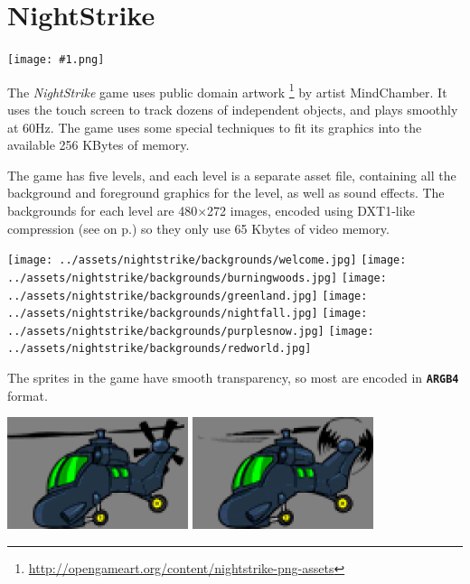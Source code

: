 \documentclass[10pt]{book}
\newcommand{\png}[1]{
\begin{center}
\texttt{[image: \#1.png]}
\end{center}
}
\newcommand{\mach}[1]{\texttt{\textbf{#1}}}
\newcommand{\xref}[1]{\textit{\nameref{#1}} on  p.\pageref{#1}}
\begin{document}
\newpage
\section{NightStrike}
\label{nightstrike}

\png{nightstrike}

The \textit{NightStrike} game uses public domain artwork
\footnote{\url{http://opengameart.org/content/nightstrike-png-assets}}
by artist MindChamber.
It uses the touch screen to track dozens of independent objects,
and plays smoothly at 60Hz.
The game uses some special techniques to fit its graphics into the available 256 KBytes of memory.

The game has five levels, and each level is a separate asset file, containing all the background and foreground graphics
for the level, as well as sound effects.
The backgrounds for each level are 480$\times$272 images, encoded using DXT1-like compression
(see \xref{dxt1})
so they only use 65 Kbytes of video memory.

\begin{center}
\texttt{[image: ../assets/nightstrike/backgrounds/welcome.jpg]}
\texttt{[image: ../assets/nightstrike/backgrounds/burningwoods.jpg]}
\texttt{[image: ../assets/nightstrike/backgrounds/greenland.jpg]}
\texttt{[image: ../assets/nightstrike/backgrounds/nightfall.jpg]}
\texttt{[image: ../assets/nightstrike/backgrounds/purplesnow.jpg]}
\texttt{[image: ../assets/nightstrike/backgrounds/redworld.jpg]}
\end{center}

\newpage

The sprites in the game have smooth transparency, so most are encoded in \mach{ARGB4} format.

\begin{center}
\includegraphics[width=150pt]{previews/nightstrike_1-HELI-00.png}
\includegraphics[width=150pt]{previews/nightstrike_1-HELI-01.png}
\end{center}
\end{document}
